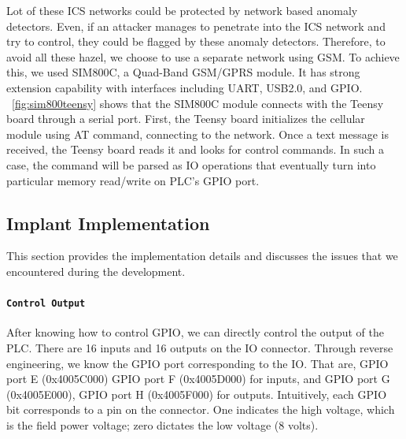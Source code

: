 Lot of these ICS networks could be protected by network based anomaly detectors. Even, if an attacker manages to penetrate into the ICS network and try to control, they could be flagged by these anomaly detectors. Therefore, to avoid all these hazel, we choose to use a separate network using GSM. To achieve this, we used SIM800C, a Quad-Band GSM/GPRS module. It has strong extension capability with interfaces including UART, USB2.0, and GPIO. ~\autoref{fig:sim800teensy} shows that the SIM800C module connects with the Teensy board through a serial port. First, the Teensy board initializes the cellular module using AT command, connecting to the network. Once a text message is received, the Teensy board reads it and looks for control commands. In such a case, the command will be parsed as IO operations that eventually turn into particular memory read/write on PLC's GPIO port.




\subsection{Implant Implementation}

This section provides the implementation details and discusses the issues that we encountered during the development. 

\paragraph{\textbf{\texttt{Control Output}}} After knowing how to control GPIO, we can directly control the output of the PLC. There are 16 inputs and 16 outputs on the IO connector. Through reverse engineering, we know the GPIO port corresponding to the IO.  That are, GPIO port E (0x4005C000) GPIO port F (0x4005D000) for inputs, and GPIO port G (0x4005E000), GPIO port H (0x4005F000) for outputs. Intuitively, each GPIO bit corresponds to a pin on the connector. One indicates the high voltage, which is the field power voltage; zero dictates the low voltage (8 volts).

